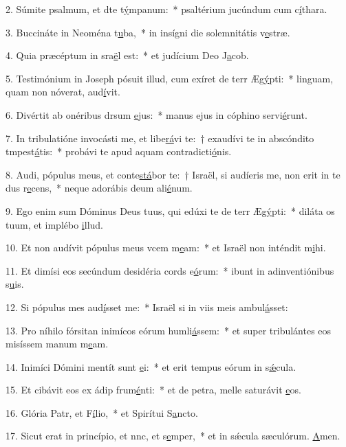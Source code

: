 2. Súmite psalmum, et dte t\uline{ý}mpanum:~* psaltérium jucúndum cum c\uline{í}thara.\par 
3. Buccináte in Neoména t\uline{u}ba,~* in insígni die solemnitátis v\uline{e}stræ.\par 
4. Quia præcéptum in sra\uline{ë}l est:~* et judícium Deo J\uline{a}cob.\par 
5. Testimónium in Joseph pósuit illud, cum exíret de terr Æg\uline{ý}pti:~* linguam, quam non nóverat, aud\uline{í}vit.\par 
6. Divértit ab onéribus drsum \uline{e}jus:~* manus ejus in cóphino servi\uline{é}runt.\par 
7. In tribulatióne invocásti me, et libe\uline{rá}vi te:~† exaudívi te in abscóndito tmpest\uline{á}tis:~* probávi te apud aquam contradicti\uline{ó}nis.\par 
8. Audi, pópulus meus, et conte\uline{stá}bor te:~† Israël, si audíeris me, non erit in te dus r\uline{e}cens,~* neque adorábis deum ali\uline{é}num.\par 
9. Ego enim sum Dóminus Deus tuus, qui edúxi te de terr Æg\uline{ý}pti:~* diláta os tuum, et implébo \uline{i}llud.\par 
10. Et non audívit pópulus meus vcem m\uline{e}am:~* et Israël non inténdit m\uline{i}hi.\par 
11. Et dimísi eos secúndum desidéria cords e\uline{ó}rum:~* ibunt in adinventiónibus s\uline{u}is.\par 
12. Si pópulus mes aud\uline{í}sset me:~* Israël si in viis meis ambul\uline{á}sset:\par 
13. Pro níhilo fórsitan inimícos eórum humli\uline{á}ssem:~* et super tribulántes eos misíssem manum m\uline{e}am.\par 
14. Inimíci Dómini mentít sunt \uline{e}i:~* et erit tempus eórum in s\uline{ǽ}cula.\par 
15. Et cibávit eos ex ádip frum\uline{é}nti:~* et de petra, melle saturávit \uline{e}os.\par 
16. Glória Patr, et F\uline{í}lio,~* et Spirítui S\uline{a}ncto.\par 
17. Sicut erat in princípio, et nnc, et s\uline{e}mper,~* et in sǽcula sæculórum. \uline{A}men.\par 
